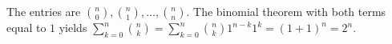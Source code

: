 The entries are $\binom n0,\binom n1,\ldots,\binom nn$. The binomial theorem with both terms equal to $1$ yields $\sum_{k=0}^n\binom nk=\sum_{k=0}^n\binom nk1^{n-k}1^k=(1+1)^n=\boxed{2^n}$.

